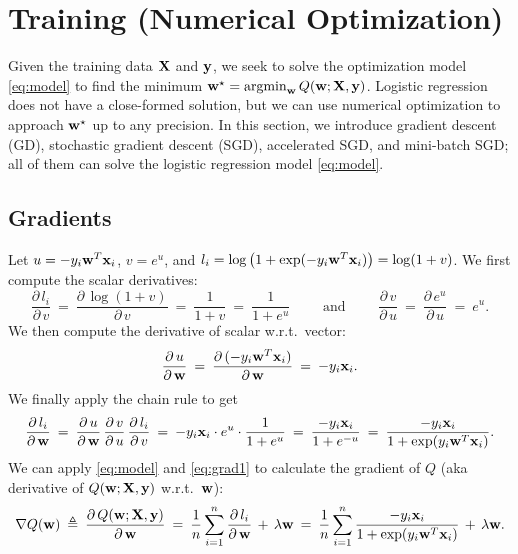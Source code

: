 \documentclass[11pt]{article}
\numberwithin{equation}{section}
\def\w{{\bf w}}
\def\X{{\bf X}}
\def\x{{\bf x}}
\def\y{{\bf y}}
\def\argmin{\mathop{\rm argmin}}
\def\argmin{\mathop{\rm argmin}}
\begin{document}
\section{Training (Numerical Optimization)}


Given the training data $\X$ and $\y$, we seek to solve the optimization model \eqref{eq:model} to find the minimum $\w^\star = \argmin_{\w} Q (\w ; \X , \y )$.
Logistic regression does not have a close-formed solution, but we can use numerical optimization to approach $\w^\star$ up to any precision.
In this section, we introduce gradient descent (GD), stochastic gradient descent (SGD), accelerated SGD, and mini-batch SGD; all of them can solve the logistic regression model \eqref{eq:model}.



\subsection{Gradients} \label{sec:alg:grad}

Let $u = -y_i \w^T \x_i $, $v = e^u$, and $l_i = \log \big( 1 + \exp ( - y_i \w^T \x_i ) \big) = \log (1 + v)$.
We first compute the scalar derivatives:
\begin{equation*}
\frac{ \partial \, l_i }{\partial \, v}
\: = \: \frac{ \partial \, \log (1 + v) }{\partial \, v}
\: = \: \frac{1}{1+v} 
\: = \: \frac{1}{1+e^u}
\qquad \textrm{ and } \qquad
\frac{ \partial \, v }{\partial \, u}
\: = \: \frac{ \partial \, e^u }{\partial \, u}
\: = \: e^u  .
\end{equation*}
We then compute the derivative of scalar w.r.t.\ vector:
\begin{equation*}
\frac{ \partial \, u }{\partial \, \w }
\: = \: \frac{ \partial \, (-y_i \w^T \x_i) }{\partial \, \w }
\: = \: - y_i \x_i .
\end{equation*}
We finally apply the chain rule to get 
\begin{equation} \label{eq:grad1}
\frac{ \partial \, l_i }{\partial \, \w }
\: = \: \frac{ \partial \, u }{\partial \, \w } \, \frac{ \partial \, v }{\partial \, u } 
\, \frac{ \partial \, l_i }{\partial \, v} 
\: = \:  - y_i \x_i  \cdot e^u \cdot \frac{1}{1+e^u}
\: = \: \frac{ - y_i \x_i }{1+e^{-u}}
\: = \: \frac{ - y_i \x_i }{1+\exp({y_i \w^T \x_i})} .
\end{equation}
We can apply \eqref{eq:model} and \eqref{eq:grad1} to calculate the gradient of $Q$ (aka derivative of $Q (\w; \X , \y)$ w.r.t.\ $\w$):
\begin{equation}\label{eq:grad2}
\nabla Q (\w) 
\: \triangleq \:
\frac{ \partial \, Q (\w ; \X , \y) }{\partial \, \w }
\: = \: \frac{1}{n} \sum_{i=1}^n \frac{ \partial \, l_i }{\partial \, \w } \, + \, \lambda \w 
\: = \: \frac{1}{n} \sum_{i=1}^n \frac{ -y_i \x_i }{1+\exp({y_i \w^T \x_i})} \, + \, \lambda \w  .
\end{equation}
\end{document}

